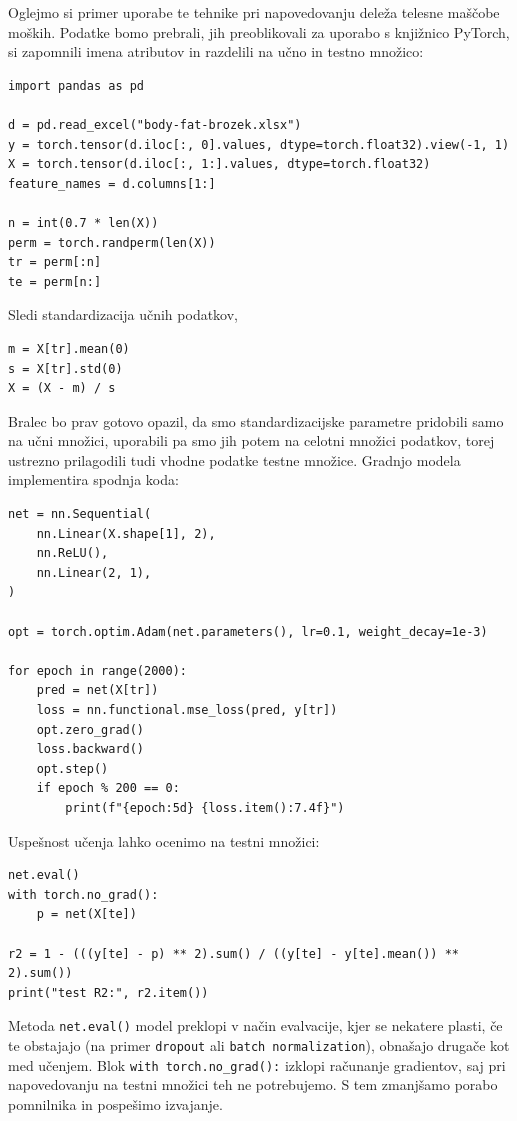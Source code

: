 Oglejmo si primer uporabe te tehnike pri napovedovanju deleža telesne maščobe moških.
 Podatke bomo prebrali, jih preoblikovali za uporabo s knjižnico PyTorch, si zapomnili imena atributov in razdelili na učno in testno množico:
\vspace*{3mm}
\begin{lstlisting}
import pandas as pd

d = pd.read_excel("body-fat-brozek.xlsx")
y = torch.tensor(d.iloc[:, 0].values, dtype=torch.float32).view(-1, 1)
X = torch.tensor(d.iloc[:, 1:].values, dtype=torch.float32)
feature_names = d.columns[1:]

n = int(0.7 * len(X))
perm = torch.randperm(len(X))
tr = perm[:n]
te = perm[n:]
\end{lstlisting}
%
Sledi standardizacija učnih podatkov,
\vspace*{3mm}
\begin{lstlisting}
m = X[tr].mean(0)
s = X[tr].std(0)
X = (X - m) / s
\end{lstlisting}
Bralec bo prav gotovo opazil, da smo standardizacijske parametre pridobili samo na učni množici, uporabili pa smo jih potem na celotni množici podatkov, torej ustrezno prilagodili tudi vhodne podatke testne množice. Gradnjo modela implementira spodnja koda:
\vspace*{3mm}
\begin{lstlisting}
net = nn.Sequential(
    nn.Linear(X.shape[1], 2),
    nn.ReLU(),
    nn.Linear(2, 1),
)

opt = torch.optim.Adam(net.parameters(), lr=0.1, weight_decay=1e-3)

for epoch in range(2000):
    pred = net(X[tr])
    loss = nn.functional.mse_loss(pred, y[tr])
    opt.zero_grad()
    loss.backward()
    opt.step()
    if epoch % 200 == 0:
        print(f"{epoch:5d} {loss.item():7.4f}")
\end{lstlisting}

Uspešnost učenja lahko ocenimo na testni množici:
\vspace*{3mm}
\begin{lstlisting}
net.eval()
with torch.no_grad():
    p = net(X[te])

r2 = 1 - (((y[te] - p) ** 2).sum() / ((y[te] - y[te].mean()) ** 2).sum())
print("test R2:", r2.item())
\end{lstlisting}
Metoda \texttt{net.eval()} model preklopi v način evalvacije, kjer se nekatere plasti, če te obstajajo (na primer \texttt{dropout} ali \texttt{batch normalization}), obnašajo drugače kot med učenjem. Blok \texttt{with torch.no\_grad():} izklopi računanje gradientov, saj pri napovedovanju na testni množici teh ne potrebujemo. S tem zmanjšamo porabo pomnilnika in pospešimo izvajanje.

